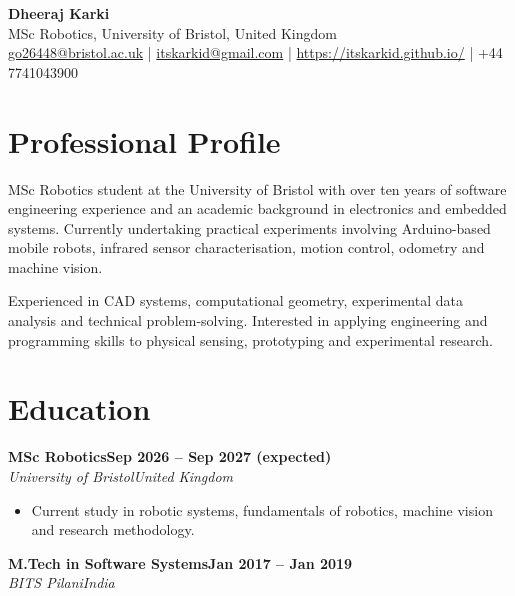 \documentclass[10pt,a4paper]{article}
\newcommand{\cventry}[4]{
    \textbf{#1}\hfill\textbf{#2}\\
    \textit{#3}\hfill\textit{#4}
    \par
}
\begin{document}
\begin{center}
    {\LARGE\bfseries Dheeraj Karki}\\[5pt]
    MSc Robotics, University of Bristol, United Kingdom\\[3pt]
    \href{mailto:go26448@bristol.ac.uk}
         {go26448@bristol.ac.uk}
    \quad|\quad
    \href{mailto:itskarkid@gmail.com}
         {itskarkid@gmail.com}
    \quad|\quad
    \href{https://itskarkid.github.io/}
         {https://itskarkid.github.io/}
    \quad|\quad
    +44 7741043900\\[3pt]
\end{center}

\section*{Professional Profile}

MSc Robotics student at the University of Bristol
with over ten years of software engineering
experience and an academic background in electronics
and embedded systems. Currently undertaking practical
experiments involving Arduino-based mobile robots,
infrared sensor characterisation, motion control,
odometry and machine vision.

Experienced in CAD systems, computational geometry,
experimental data analysis and technical
problem-solving. Interested in applying engineering
and programming skills to physical sensing,
prototyping and experimental research.

\section*{Education}

\cventry
    {MSc Robotics}
    {Sep 2026 -- Sep 2027 (expected)}
    {University of Bristol}
    {United Kingdom}

\begin{itemize}
    \item Current study in robotic systems,
    fundamentals of robotics, machine vision
    and research methodology.
\end{itemize}

\cventry
    {M.Tech in Software Systems}
    {Jan 2017 -- Jan 2019}
    {BITS Pilani}
    {India}
\end{document}
